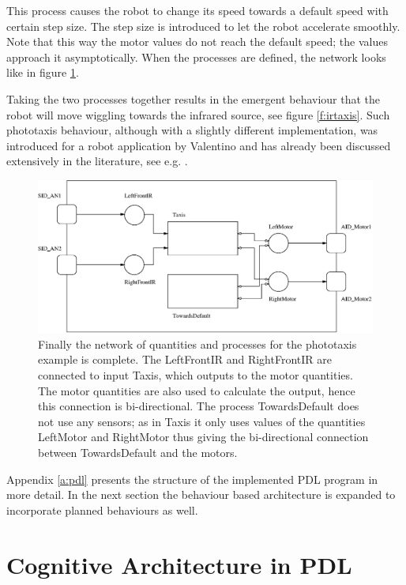 This process causes the robot to change its speed towards a default speed with certain step size. The step size is introduced to let the robot accelerate smoothly. Note that this way the motor values do not reach the default speed; the values approach it asymptotically. When the processes are defined, the network looks like in figure \ref{f:robots:pdl}.

Taking the two processes together results in the emergent behaviour that the robot will move wiggling towards the infrared source, see figure \ref{f:irtaxis}. Such phototaxis behaviour, although with a slightly different implementation, was introduced for a robot application by Valentino \citet{braitenberg:1984} and has already been discussed extensively in the literature, see e.g. \citep{steels:1994}.

\begin{figure}
\centerline{\includegraphics[width=12cm]{robots//pdl_network.eps}}
\caption{Finally the network of quantities and processes for the phototaxis example is complete. The LeftFrontIR and RightFrontIR are connected to input Taxis, which outputs to the motor quantities. The motor quantities are also used to calculate the output, hence this connection is bi-directional. The process TowardsDefault does not use any sensors; as in Taxis it only uses values of the quantities LeftMotor and RightMotor thus giving the bi-directional connection between TowardsDefault and the motors.}
\label{f:robots:pdl}
\end{figure}

Appendix \ref{a:pdl} presents the structure of the implemented PDL program in more detail. In the next section the behaviour based architecture is expanded to incorporate planned behaviours as well.


\section{Cognitive Architecture in PDL}\label{s:robots:architecture}
	
